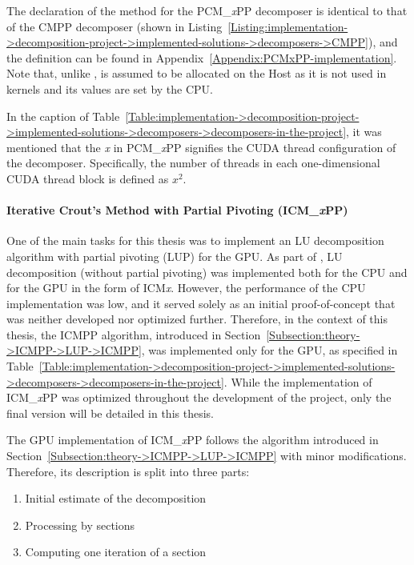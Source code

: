 The declaration of the  method for the PCM\_\textit{x}PP decomposer is identical to that of the CMPP decomposer (shown in Listing~\ref{Listing:implementation->decomposition-project->implemented-solutions->decomposers->CMPP}), and the definition can be found in Appendix~\ref{Appendix:PCMxPP-implementation}.
Note that, unlike ,  is assumed to be allocated on the Host as it is not used in kernels and its values are set by the CPU.

In the caption of Table~\ref{Table:implementation->decomposition-project->implemented-solutions->decomposers->decomposers-in-the-project}, it was mentioned that the \textit{x} in PCM\_\textit{x}PP signifies the CUDA thread configuration of the decomposer.
Specifically, the number of threads in each one-dimensional CUDA thread block is defined as $x^2$.

\paragraph{Iterative Crout's Method with Partial Pivoting (ICM\_\textit{x}PP)} \label{Paragraph:implementation->decomposition-project->implemented-solutions->decomposers->ICMxPP}
One of the main tasks for this thesis was to implement an LU decomposition algorithm with partial pivoting (LUP) for the GPU.
As part of  \cite{Cejka2022}, LU decomposition (without partial pivoting) was implemented both for the CPU and for the GPU in the form of ICM\textit{x}.
However, the performance of the CPU implementation was low, and it served solely as an initial proof-of-concept that was neither developed nor optimized further.
Therefore, in the context of this thesis, the ICMPP algorithm, introduced in Section~\ref{Subsection:theory->ICMPP->LUP->ICMPP}, was implemented only for the GPU, as specified in Table~\ref{Table:implementation->decomposition-project->implemented-solutions->decomposers->decomposers-in-the-project}.
While the implementation of ICM\_\textit{x}PP was optimized throughout the development of the project, only the final version will be detailed in this thesis.

The GPU implementation of ICM\_\textit{x}PP follows the algorithm introduced in Section~\ref{Subsection:theory->ICMPP->LUP->ICMPP} with minor modifications.
Therefore, its description is split into three parts:

\begin{enumerate}
	\item Initial estimate of the decomposition
	\item Processing by sections
	\item Computing one iteration of a section
\end{enumerate}

